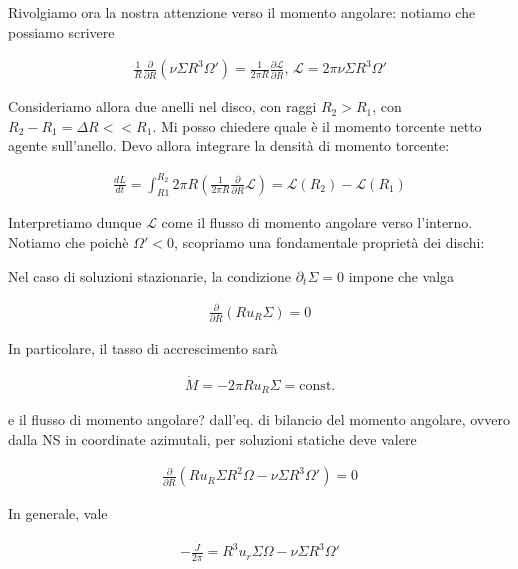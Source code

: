 \documentclass{report}
\begin{document}
Rivolgiamo ora la nostra attenzione verso il momento angolare: notiamo che possiamo scrivere 

\begin{align}
    \frac{1}{R}\frac{\partial}{\partial R}(\nu \Sigma R^3 \Omega') = \frac{1}{2\pi R}\frac{\partial \mathcal{L}}{\partial R}, \, \mathcal{L} = 2\pi\nu \Sigma R^3\Omega'
\end{align}

Consideriamo allora due anelli nel disco, con raggi \(R_2 > R_1\), con \(R_2-R_1 = \Delta R << R_1\). Mi posso chiedere quale è il momento torcente netto agente sull'anello. Devo allora integrare la densità di momento torcente: 

\begin{align}
    \frac{dL}{dt} = \int_{R1}^{R_2} 2\pi R \left(\frac{1}{2\pi R}\frac{\partial}{\partial R} \mathcal{L}\right) = \mathcal{L}(R_2) - \mathcal{L}(R_1)
\end{align}

Interpretiamo dunque \(\mathcal{L}\) come il flusso di momento angolare verso l'interno. Notiamo che poichè \(\Omega' <0\), scopriamo una fondamentale proprietà dei dischi: 


Nel caso di soluzioni stazionarie, la condizione \(\partial_t \Sigma =0\) impone che valga 

\begin{align}
    \frac{\partial}{\partial R}(Ru_R \Sigma) = 0 
\end{align}

In particolare, il tasso di accrescimento sarà 

\begin{align}
    \dot{M} = -2\pi R u_R \Sigma = \text{const.}
\end{align}

e il flusso di momento angolare? dall'eq. di bilancio del momento angolare, ovvero dalla NS in coordinate azimutali, per soluzioni statiche deve valere 

\begin{align}
    \frac{\partial}{\partial R}(Ru_R \Sigma R^2 \Omega - \nu \Sigma R^3\Omega') = 0 
\end{align}

In generale, vale 

\begin{align}
    -\frac{\dot{J}}{2\pi} = R^3u_r \Sigma \Omega - \nu\Sigma R^3 \Omega' 
\end{align}
\end{document}
